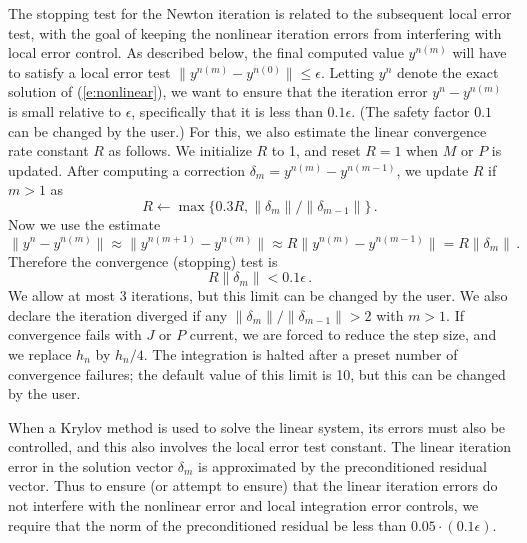 The stopping test for the Newton iteration is related to the
subsequent local error test, with the goal of keeping the nonlinear
iteration errors from interfering with local error control.  As
described below, the final computed value $y^{n(m)}$ will have to
satisfy a local error test $\|y^{n(m)} - y^{n(0)}\| \leq \epsilon$.
Letting $y^n$ denote the exact solution of (\ref{e:nonlinear}), we want
to ensure that the iteration error $y^n - y^{n(m)}$ is small relative
to $\epsilon$, specifically that it is less than $0.1 \epsilon$.
(The safety factor $0.1$ can be changed by the user.)  For this, we
also estimate the linear convergence rate constant $R$ as follows.
We initialize $R$ to 1, and reset $R = 1$ when $M$ or $P$ is updated.
After computing a correction $\delta_m = y^{n(m)}-y^{n(m-1)}$, we
update $R$ if $m > 1$ as
\begin{equation*}
  R \leftarrow \max\{0.3R , \|\delta_m\| / \|\delta_{m-1}\| \} \, . 
\end{equation*}
Now we use the estimate
\begin{equation*}
  \| y^n - y^{n(m)} \| \approx \| y^{n(m+1)} - y^{n(m)} \| 
  \approx R \| y^{n(m)} - y^{n(m-1)} \|  =  R \|\delta_m \| \, . 
\end{equation*}
Therefore the convergence (stopping) test is 
\begin{equation*}
  R \|\delta_m \| < 0.1 \epsilon \, .
\end{equation*}
We allow at most 3 iterations, but this limit can be changed by the
user.  We also declare the iteration diverged if any $\|\delta_m\| /
\|\delta_{m-1}\| > 2$ with $m > 1$. If convergence fails with $J$ or
$P$ current, we are forced to reduce the step size, and we replace
$h_n$ by $h_n/4$.  The integration is halted after a preset number
of convergence failures; the default value of this limit is 10, 
but this can be changed by the user.

When a Krylov method is used to solve the linear system, its errors must also
be controlled, and this also involves the local error test constant.  The
linear iteration error in the solution vector $\delta_m$ is
approximated by the preconditioned residual vector.  Thus to ensure
(or attempt to ensure) that the linear iteration errors do not
interfere with the nonlinear error and local integration error
controls, we require that the norm of the preconditioned residual
be less than $0.05 \cdot (0.1 \epsilon)$.

